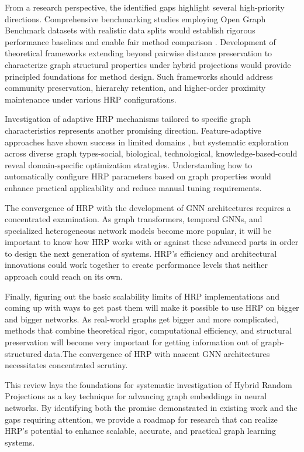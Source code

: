 \documentclass[conference]{IEEEtran}
\begin{document}
From a research perspective, the identified gaps highlight several high-priority directions. Comprehensive benchmarking studies employing Open Graph Benchmark datasets with realistic data splits would establish rigorous performance baselines and enable fair method comparison \cite{hu2020ogb}. Development of theoretical frameworks extending beyond pairwise distance preservation to characterize graph structural properties under hybrid projections would provide principled foundations for method design. Such frameworks should address community preservation, hierarchy retention, and higher-order proximity maintenance under various HRP configurations.

Investigation of adaptive HRP mechanisms tailored to specific graph characteristics represents another promising direction. Feature-adaptive approaches have shown success in limited domains \cite{yang2021cancelable}, but systematic exploration across diverse graph types-social, biological, technological, knowledge-based-could reveal domain-specific optimization strategies. Understanding how to automatically configure HRP parameters based on graph properties would enhance practical applicability and reduce manual tuning requirements.

The convergence of HRP with the development of GNN architectures requires a concentrated examination. As graph transformers, temporal GNNs, and specialized heterogeneous network models become more popular, it will be important to know how HRP works with or against these advanced parts in order to design the next generation of systems. HRP's efficiency and architectural innovations could work together to create performance levels that neither approach could reach on its own.

Finally, figuring out the basic scalability limits of HRP implementations and coming up with ways to get past them will make it possible to use HRP on bigger and bigger networks. As real-world graphs get bigger and more complicated, methods that combine theoretical rigor, computational efficiency, and structural preservation will become very important for getting information out of graph-structured data.The convergence of HRP with nascent GNN architectures necessitates concentrated scrutiny. 

This review lays the foundations for systematic investigation of Hybrid Random Projections as a key technique for advancing graph embeddings in neural networks. By identifying both the promise demonstrated in existing work and the gaps requiring attention, we provide a roadmap for research that can realize HRP's potential to enhance scalable, accurate, and practical graph learning systems.
\end{document}
